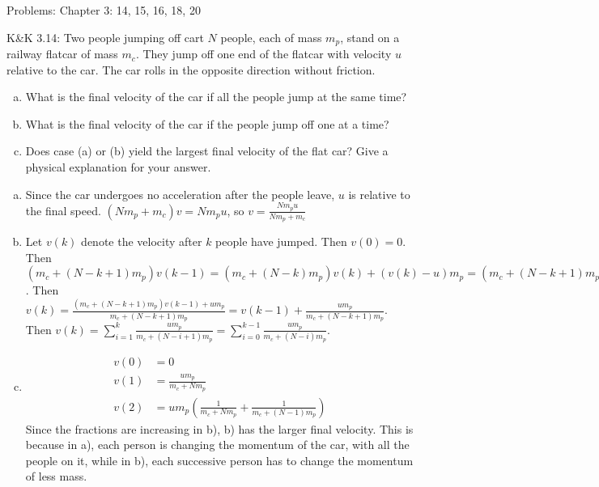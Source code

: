 \documentclass{esg8012pset}
\date{October 1}
\begin{document}
\noindent Problems: Chapter 3: 14, 15, 16, 18, 20


\begin{problem}{K\&K 3.14: Two people jumping off cart}
  $N$ people, each of mass $m_p$, stand on a railway flatcar of mass $m_c$. They jump off one end of the flatcar with velocity $u$ relative to the car. The car rolls in the opposite direction without friction.
  \begin{enumerate}[(a)]
    \item What is the final velocity of the car if all the people jump at the same time?
    \item What is the final velocity of the car if the people jump off one at a time?
    \item Does case (a) or (b) yield the largest final velocity of the flat car?  Give a physical explanation for your answer.
  \end{enumerate}
\end{problem}
\begin{solution}
  \begin{enumerate}[a)]
    \item Since the car undergoes no acceleration after the people leave, $u$ is relative to the final speed.  $(N m_p + m_c)v = N m_p u$, so $v = \frac{N m_p u}{N m_p + m_c}$
    \item Let $v(k)$ denote the velocity after $k$ people have jumped.  Then $v(0) = 0$.  Then $(m_c + (N - k + 1)m_p)v(k - 1) = (m_c + (N - k)m_p)v(k) + (v(k) - u) m_p = (m_c + (N - k + 1)m_p)v(k)  - u m_p$.  Then $v(k) = \frac{(m_c + (N - k + 1)m_p)v(k - 1) + u m_p}{m_c + (N - k + 1)m_p} = v(k - 1) + \frac{u m_p}{m_c + (N - k + 1)m_p}$.  Then $v(k) = \sum_{i=1}^{k} \frac{u m_p}{m_c + (N - i + 1)m_p} = \sum_{i=0}^{k-1} \frac{u m_p}{m_c + (N - i)m_p}$.
    \item \begin{align*} v(0) & = 0 \\
      v(1) & = \frac{u m_p}{m_c + N m_p} \\
      v(2) & = u m_p\left(\frac{1}{m_c + N m_p} + \frac{1}{m_c + (N - 1) m_p}\right)
    \end{align*} Since the fractions are increasing in b), b) has the larger final velocity.  This is because in a), each person is changing the momentum of the car, with all the people on it, while in b), each successive person has to change the momentum of less mass.
  \end{enumerate}
\end{solution}
\end{document}
